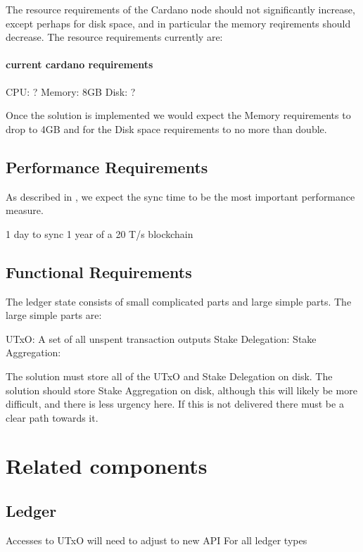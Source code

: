 \documentclass[11pt,a4paper]{article}
\begin{document}
The resource requirements of the Cardano node should not significantly increase,
except perhaps for disk space, and in particular the memory reqirements should
decrease.  The resource requirements currently are:

\paragraph{current cardano requirements}
CPU: ?
Memory: 8GB
Disk: ?


Once the solution is implemented we would expect the Memory requirements to drop
to 4GB and for the Disk space requirements to no more than double.

\subsection{Performance Requirements}
\label{Performance Requirements}
As described in , we expect the sync time to be the most important performance measure.

1 day to sync 1 year of a 20 T/s blockchain

\subsection{Functional Requirements}

The ledger state consists of small complicated parts and large simple parts. The
large simple parts are:

UTxO: A set of all unspent transaction outputs
Stake Delegation: 
Stake Aggregation: 

The solution must store all of the UTxO and Stake Delegation on disk.  The
solution should store Stake Aggregation on disk, although this will likely be
more difficult, and there is less urgency here. If this is not delivered there
must be a clear path towards it.

\section{Related components}
\label{components}

\subsection{Ledger}

Accesses to UTxO will need to adjust to new API
For all ledger types
\end{document}
